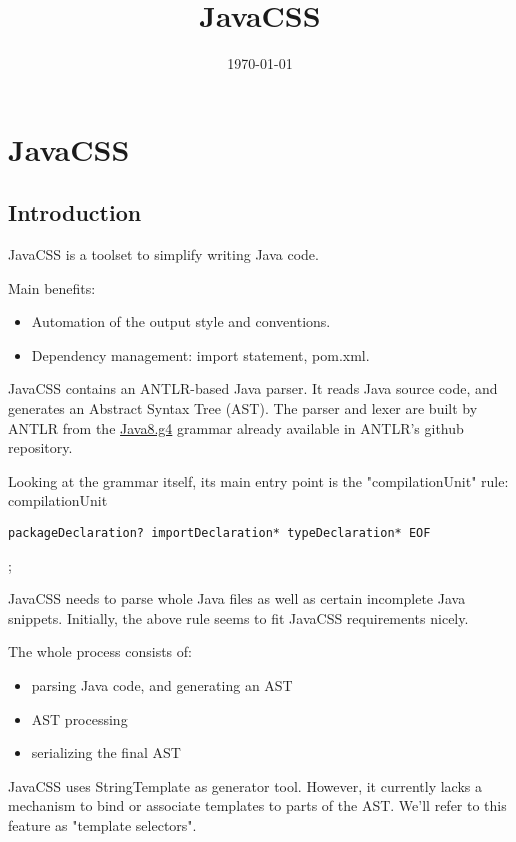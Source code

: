 \documentclass[11pt]{article}
\date{\today}
\title{JavaCSS}
\begin{document}
\maketitle
\tableofcontents

\section{JavaCSS}
\label{sec-1}


\subsection{Introduction}
\label{sec-1-1}
JavaCSS is a toolset to simplify writing Java code.

Main benefits:
\begin{itemize}
\item Automation of the output style and conventions.
\item Dependency management: import statement, pom.xml.
\end{itemize}

JavaCSS contains an ANTLR-based Java parser. It reads Java source code, and generates an Abstract Syntax Tree (AST).
The parser and lexer are built by ANTLR from the \href{https://raw.githubusercontent.com/antlr/grammars-v4/master/java8/Java8.g4}{Java8.g4} grammar already available in ANTLR's github repository.

Looking at the grammar itself, its main entry point is the "compilationUnit" rule:
  compilationUnit
\begin{verbatim}
packageDeclaration? importDeclaration* typeDeclaration* EOF
\end{verbatim}
;

JavaCSS needs to parse whole Java files as well as certain incomplete Java snippets. Initially, the above rule seems to fit JavaCSS
requirements nicely.

The whole process consists of:
\begin{itemize}
\item parsing Java code, and generating an AST
\item AST processing
\item serializing the final AST
\end{itemize}

JavaCSS uses StringTemplate as generator tool. However, it currently lacks a mechanism to bind or associate templates to parts of the AST.
We'll refer to this feature as "template selectors".
\end{document}
